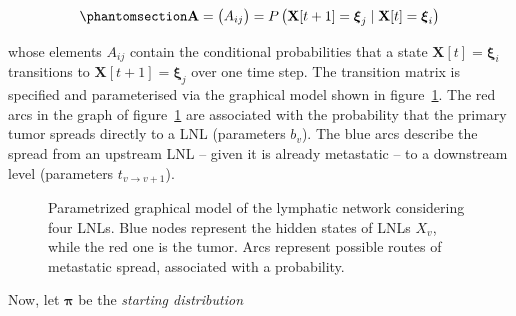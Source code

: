 \documentclass[
  sn-mathphys-num,
]{sn-jnl}
\begin{document}
\begin{equation}\phantomsection\label{eq-transition-matrix}{
\mathbf{A} = \begin{pmatrix} A_{ij} \end{pmatrix} = P \left( \mathbf{X}[t+1] = \boldsymbol{\xi}_j \mid \mathbf{X}[t] = \boldsymbol{\xi}_i \right)
}\end{equation}

whose elements \(A_{ij}\) contain the conditional probabilities that a
state \(\mathbf{X}[t]=\boldsymbol{\xi}_i\) transitions to
\(\mathbf{X}[t+1]=\boldsymbol{\xi}_j\) over one time step. The
transition matrix is specified and parameterised via the graphical model
shown in figure~\ref{fig-graph}. The red arcs in the graph of
figure~\ref{fig-graph} are associated with the probability that the
primary tumor spreads directly to a LNL (parameters \(b_v\)). The blue
arcs describe the spread from an upstream LNL -- given it is already
metastatic -- to a downstream level (parameters
\(t_{v \rightarrow v+1}\)).

\begin{figure}


\caption{\label{fig-graph}Parametrized graphical model of the lymphatic
network considering four LNLs. Blue nodes represent the hidden states of
LNLs \(X_v\), while the red one is the tumor. Arcs represent possible
routes of metastatic spread, associated with a probability.}

\end{figure}%

Now, let \(\boldsymbol{\pi}\) be the \emph{starting distribution}
\end{document}
